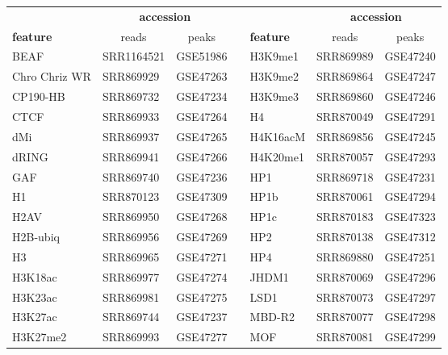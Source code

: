 \begin{table}[htb]
\centering
\begin{tabular}{lllllll}
\cline{1-3} \cline{5-7}
                 & \multicolumn{2}{c}{\textbf{accession}} &  & & \multicolumn{2}{c}{\textbf{accession}}  \\
\textbf{feature} & \multicolumn{1}{c}{reads}           & \multicolumn{1}{c}{peaks}            &  & \textbf{feature} & \multicolumn{1}{c}{reads} & \multicolumn{1}{c}{peaks}    \\ \cline{1-3} \cline{5-7} 
BEAF             & SRR1164521          & GSE51986         &  & H3K9me1          & SRR869989 & GSE47240 \\
Chro Chriz WR    & SRR869929           & GSE47263         &  & H3K9me2          & SRR869864 & GSE47247 \\
CP190-HB         & SRR869732           & GSE47234         &  & H3K9me3          & SRR869860 & GSE47246 \\
CTCF             & SRR869933           & GSE47264         &  & H4               & SRR870049 & GSE47291 \\
dMi              & SRR869937           & GSE47265         &  & H4K16acM         & SRR869856 & GSE47245 \\
dRING            & SRR869941           & GSE47266         &  & H4K20me1         & SRR870057 & GSE47293 \\
GAF              & SRR869740           & GSE47236         &  & HP1              & SRR869718 & GSE47231 \\
H1               & SRR870123           & GSE47309         &  & HP1b             & SRR870061 & GSE47294 \\
H2AV             & SRR869950           & GSE47268         &  & HP1c             & SRR870183 & GSE47323 \\
H2B-ubiq         & SRR869956           & GSE47269         &  & HP2              & SRR870138 & GSE47312 \\
H3               & SRR869965           & GSE47271         &  & HP4              & SRR869880 & GSE47251 \\
H3K18ac          & SRR869977           & GSE47274         &  & JHDM1            & SRR870069 & GSE47296 \\
H3K23ac          & SRR869981           & GSE47275         &  & LSD1             & SRR870073 & GSE47297 \\
H3K27ac          & SRR869744           & GSE47237         &  & MBD-R2           & SRR870077 & GSE47298 \\
H3K27me2         & SRR869993           & GSE47277         &  & MOF              & SRR870081 & GSE47299 \\

\end{tabular}
\end{table}
